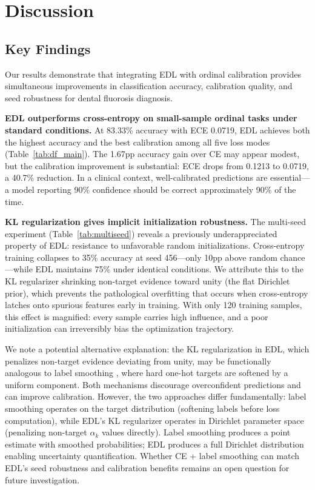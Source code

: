 \section{Discussion}

\subsection{Key Findings}

Our results demonstrate that integrating EDL with ordinal calibration provides simultaneous improvements in classification accuracy, calibration quality, and seed robustness for dental fluorosis diagnosis.

\textbf{EDL outperforms cross-entropy on small-sample ordinal tasks under standard conditions.} At 83.33\% accuracy with ECE 0.0719, EDL achieves both the highest accuracy and the best calibration among all five loss modes (Table~\ref{tab:df_main}). The 1.67pp accuracy gain over CE may appear modest, but the calibration improvement is substantial: ECE drops from 0.1213 to 0.0719, a 40.7\% reduction. In a clinical context, well-calibrated predictions are essential---a model reporting 90\% confidence should be correct approximately 90\% of the time.

\textbf{KL regularization gives implicit initialization robustness.} The multi-seed experiment (Table~\ref{tab:multiseed}) reveals a previously underappreciated property of EDL: resistance to unfavorable random initializations. Cross-entropy training collapses to 35\% accuracy at seed 456---only 10pp above random chance---while EDL maintains 75\% under identical conditions. We attribute this to the KL regularizer shrinking non-target evidence toward unity (the flat Dirichlet prior), which prevents the pathological overfitting that occurs when cross-entropy latches onto spurious features early in training. With only 120 training samples, this effect is magnified: every sample carries high influence, and a poor initialization can irreversibly bias the optimization trajectory.

We note a potential alternative explanation: the KL regularization in EDL, which penalizes non-target evidence deviating from unity, may be functionally analogous to label smoothing \cite{muller2019labelsmoothing}, where hard one-hot targets are softened by a uniform component. Both mechanisms discourage overconfident predictions and can improve calibration. However, the two approaches differ fundamentally: label smoothing operates on the target distribution (softening labels before loss computation), while EDL's KL regularizer operates in Dirichlet parameter space (penalizing non-target $\alpha_k$ values directly). Label smoothing produces a point estimate with smoothed probabilities; EDL produces a full Dirichlet distribution enabling uncertainty quantification. Whether CE + label smoothing can match EDL's seed robustness and calibration benefits remains an open question for future investigation.

